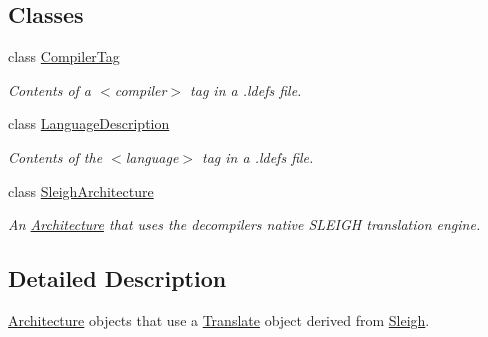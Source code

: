 \subsection*{Classes}
\begin{DoxyCompactItemize}
\item 
class \mbox{\hyperlink{class_compiler_tag}{Compiler\+Tag}}
\begin{DoxyCompactList}\small\item\em Contents of a $<$compiler$>$ tag in a .ldefs file. \end{DoxyCompactList}\item 
class \mbox{\hyperlink{class_language_description}{Language\+Description}}
\begin{DoxyCompactList}\small\item\em Contents of the $<$language$>$ tag in a .ldefs file. \end{DoxyCompactList}\item 
class \mbox{\hyperlink{class_sleigh_architecture}{Sleigh\+Architecture}}
\begin{DoxyCompactList}\small\item\em An \mbox{\hyperlink{class_architecture}{Architecture}} that uses the decompiler\textquotesingle{}s native S\+L\+E\+I\+GH translation engine. \end{DoxyCompactList}\end{DoxyCompactItemize}


\subsection{Detailed Description}
\mbox{\hyperlink{class_architecture}{Architecture}} objects that use a \mbox{\hyperlink{class_translate}{Translate}} object derived from \mbox{\hyperlink{class_sleigh}{Sleigh}}. 

